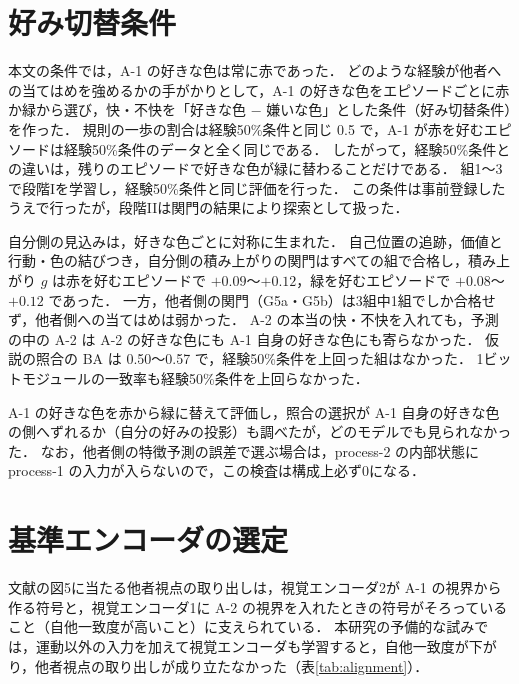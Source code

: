 \setcounter{table}{0}
\renewcommand{\thetable}{A\arabic{table}}
\setcounter{figure}{0}
\renewcommand{\thefigure}{A\arabic{figure}}

\section{好み切替条件}\label{app:switch}
本文の条件では，A-1 の好きな色は常に赤であった．
どのような経験が他者への当てはめを強めるかの手がかりとして，A-1 の好きな色をエピソードごとに赤か緑から選び，快・不快を「好きな色 $-$ 嫌いな色」とした条件（好み切替条件）を作った．
規則の一歩の割合は経験50\%条件と同じ 0.5 で，A-1 が赤を好むエピソードは経験50\%条件のデータと全く同じである．
したがって，経験50\%条件との違いは，残りのエピソードで好きな色が緑に替わることだけである．
組1〜3 で段階Iを学習し，経験50\%条件と同じ評価を行った．
この条件は事前登録したうえで行ったが，段階IIは関門の結果により探索として扱った．

自分側の見込みは，好きな色ごとに対称に生まれた．
自己位置の追跡，価値と行動・色の結びつき，自分側の積み上がりの関門はすべての組で合格し，積み上がり $g$ は赤を好むエピソードで $+0.09$〜$+0.12$，緑を好むエピソードで $+0.08$〜$+0.12$ であった．
一方，他者側の関門（G5a・G5b）は3組中1組でしか合格せず，他者側への当てはめは弱かった．
A-2 の本当の快・不快を入れても，予測の中の A-2 は A-2 の好きな色にも A-1 自身の好きな色にも寄らなかった．
仮説の照合の BA は 0.50〜0.57 で，経験50\%条件を上回った組はなかった．
1ビットモジュールの一致率も経験50\%条件を上回らなかった．

A-1 の好きな色を赤から緑に替えて評価し，照合の選択が A-1 自身の好きな色の側へずれるか（自分の好みの投影）も調べたが，どのモデルでも見られなかった．
なお，他者側の特徴予測の誤差で選ぶ場合は，process-2 の内部状態に process-1 の入力が入らないので，この検査は構成上必ず0になる．

\section{基準エンコーダの選定}\label{app:encoder}
文献\cite{noguchi2022superposition}の図5に当たる他者視点の取り出しは，視覚エンコーダ2が A-1 の視界から作る符号と，視覚エンコーダ1に A-2 の視界を入れたときの符号がそろっていること（自他一致度が高いこと）に支えられている．
本研究の予備的な試みでは，運動以外の入力を加えて視覚エンコーダも学習すると，自他一致度が下がり，他者視点の取り出しが成り立たなかった（表\ref{tab:alignment}）．

